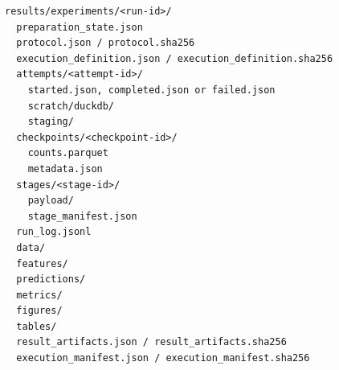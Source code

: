 \begin{lstlisting}[caption={Locked Results artifact layout.},
  label={lst:filenames}]
results/experiments/<run-id>/
  preparation_state.json
  protocol.json / protocol.sha256
  execution_definition.json / execution_definition.sha256
  attempts/<attempt-id>/
    started.json, completed.json or failed.json
    scratch/duckdb/
    staging/
  checkpoints/<checkpoint-id>/
    counts.parquet
    metadata.json
  stages/<stage-id>/
    payload/
    stage_manifest.json
  run_log.jsonl
  data/
  features/
  predictions/
  metrics/
  figures/
  tables/
  result_artifacts.json / result_artifacts.sha256
  execution_manifest.json / execution_manifest.sha256
\end{lstlisting}

